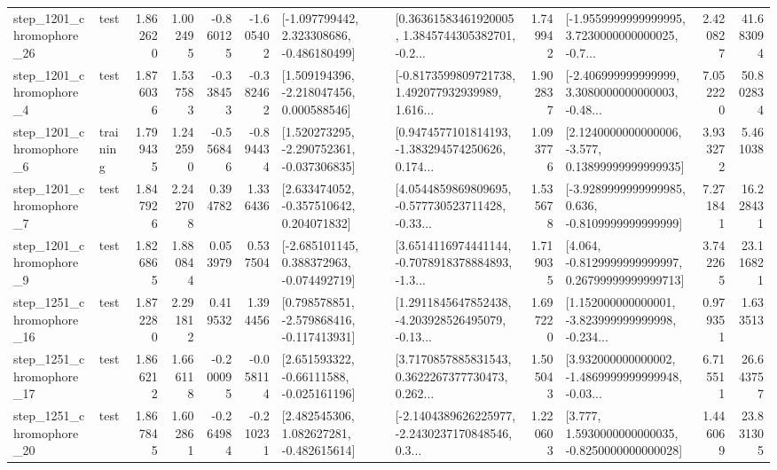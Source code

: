 \begin{tabular}{llrrrrllrlrr}
 step\_1201\_chromophore\_26 &      test &      1.862620 &    1.002495 &     -0.860125 & -1.605402 &   [-1.097799442, 2.323308686, -0.486180499] &  [0.36361583461920005, 1.3845744305382701, -0.2... &       1.749942 &  [-1.9559999999999995, 3.7230000000000025, -0.7... &            2.420827 &         41.683094 \\
  step\_1201\_chromophore\_4 &      test &      1.876036 &    1.537583 &     -0.338453 & -0.382462 &    [1.509194396, -2.218047456, 0.000588546] &  [-0.8173599809721738, 1.492077932939989, 1.616... &       1.902837 &  [-2.406999999999999, 3.3080000000000003, -0.48... &            7.052220 &         50.802834 \\
  step\_1201\_chromophore\_6 &  training &      1.799435 &    1.242590 &     -0.556846 & -0.894434 &   [1.520273295, -2.290752361, -0.037306835] &  [0.9474577101814193, -1.383294574250626, 0.174... &       1.093776 &  [2.1240000000000006, -3.577, 0.13899999999999935] &            3.933272 &          5.461038 \\
  step\_1201\_chromophore\_7 &      test &      1.847926 &    2.242708 &      0.394782 &  1.336436 &    [2.633474052, -0.357510642, 0.204071832] &  [4.0544859869809695, -0.577730523711428, -0.33... &       1.535678 &  [-3.9289999999999985, 0.636, -0.8109999999999999] &            7.271841 &         16.228431 \\
  step\_1201\_chromophore\_9 &      test &      1.826865 &    1.880844 &      0.053979 &  0.537504 &   [-2.685101145, 0.388372963, -0.074492719] &  [3.6514116974441144, -0.7078918378884893, -1.3... &       1.719035 &  [4.064, -0.8129999999999997, 0.26799999999999713] &            3.742265 &         23.116821 \\
 step\_1251\_chromophore\_16 &      test &      1.872280 &    2.291812 &      0.419532 &  1.394456 &   [0.798578851, -2.579868416, -0.117413931] &  [1.2911845647852438, -4.203928526495079, -0.13... &       1.697220 &  [1.152000000000001, -3.823999999999998, -0.234... &            0.979351 &          1.633513 \\
 step\_1251\_chromophore\_17 &      test &      1.866212 &    1.666118 &     -0.200095 & -0.058114 &    [2.651593322, -0.66111588, -0.025161196] &  [3.7170857885831543, 0.3622267377730473, 0.262... &       1.505043 &  [3.932000000000002, -1.4869999999999948, -0.03... &            6.715511 &         26.643757 \\
 step\_1251\_chromophore\_20 &      test &      1.867845 &    1.602861 &     -0.264984 & -0.210231 &    [2.482545306, 1.082627281, -0.482615614] &  [-2.1404389626225977, -2.2430237170848546, 0.3... &       1.220603 &   [3.777, 1.5930000000000035, -0.8250000000000028] &            1.446069 &         23.831305 \\

\end{tabular}
